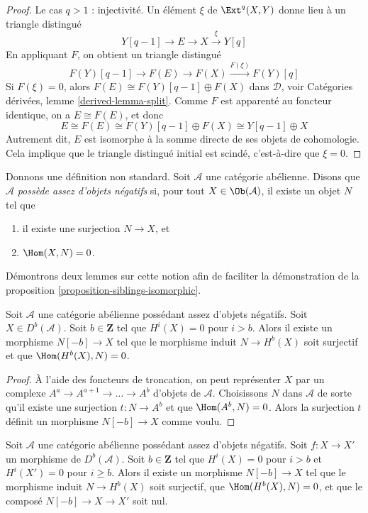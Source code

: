 \begin{proof}
\medskip\noindent
Le cas $q > 1$ : injectivité. Un élément $\xi$ de $\Ext^q(X, Y)$
donne lieu à un triangle distingué
$$
Y[q - 1] \to E \to X \xrightarrow{\xi} Y[q]
$$
En appliquant $F$, on obtient un triangle distingué
$$
F(Y)[q - 1] \to F(E) \to F(X) \xrightarrow{F(\xi)} F(Y)[q]
$$
Si $F(\xi) = 0$, alors $F(E) \cong F(Y)[q - 1] \oplus F(X)$
dans $\mathcal{D}$, voir
Catégories dérivées, lemme \ref{derived-lemma-split}.
Comme $F$ est apparenté au foncteur identique, on a
$E \cong F(E)$, et donc
$$
E \cong F(E) \cong F(Y)[q - 1] \oplus F(X) \cong Y[q - 1] \oplus X
$$
Autrement dit, $E$ est isomorphe à la
somme directe de ses objets de cohomologie. Cela implique que le
triangle distingué initial est scindé, c'est-à-dire que $\xi = 0$.
\end{proof}

\noindent
Donnons une définition non standard. Soit $\mathcal{A}$ une catégorie
abélienne. Disons que $\mathcal{A}$ {\it possède assez d'objets négatifs}
si, pour tout $X \in \Ob(\mathcal{A})$, il existe un objet $N$ tel que
\begin{enumerate}
\item il existe une surjection $N \to X$, et
\item $\Hom(X, N) = 0$.
\end{enumerate}
Démontrons deux lemmes sur cette notion afin de faciliter
la démonstration de la proposition \ref{proposition-siblings-isomorphic}.

\begin{lemma}
\label{lemma-good-map}
Soit $\mathcal{A}$ une catégorie abélienne possédant assez d'objets négatifs.
Soit $X \in D^b(\mathcal{A})$. Soit $b \in \mathbf{Z}$ tel que
$H^i(X) = 0$ pour $i > b$. Alors
il existe un morphisme $N[-b] \to X$ tel que le morphisme induit
$N \to H^b(X)$ soit surjectif et que $\Hom(H^b(X), N) = 0$.
\end{lemma}

\begin{proof}
À l'aide des foncteurs de troncation, on peut représenter $X$ par un complexe
$A^a \to A^{a + 1} \to \ldots \to A^b$ d'objets de $\mathcal{A}$.
Choisissons $N$ dans $\mathcal{A}$ de sorte qu'il existe une surjection
$t : N \to A^b$ et que $\Hom(A^b, N) = 0$. Alors la surjection $t$
définit un morphisme $N[-b] \to X$ comme voulu.
\end{proof}

\begin{lemma}
\label{lemma-good-map-zero}
Soit $\mathcal{A}$ une catégorie abélienne possédant assez d'objets négatifs.
Soit $f : X \to X'$ un morphisme de $D^b(\mathcal{A})$. Soit $b \in \mathbf{Z}$
tel que $H^i(X) = 0$ pour $i > b$ et $H^i(X') = 0$ pour $i \geq b$.
Alors il existe un morphisme $N[-b] \to X$ tel que le morphisme induit
$N \to H^b(X)$ soit surjectif, que $\Hom(H^b(X), N) = 0$, et
que le composé $N[-b] \to X \to X'$ soit nul.
\end{lemma}

